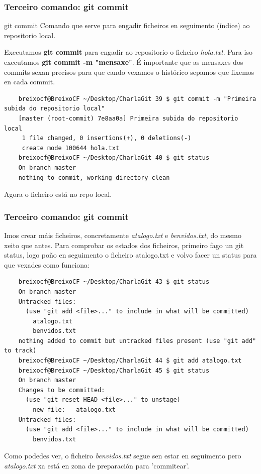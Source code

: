 \begin{frame}[fragile]
	\frametitle{Terceiro comando: git commit}
	\begin{block}{git commit}
		Comando que serve para engadir ficheiros en seguimento (índice) ao repositorio local.
	\end{block}
	\small
	Executamos \textbf{git commit} para engadir ao repositorio o ficheiro \textit{hola.txt}. Para iso executamos \textbf{git commit -m "mensaxe"}. É importante que as mensaxes dos commits sexan precisos para que cando vexamos o histórico sepamos que fixemos en cada commit.
	\tiny 
	\begin{verbatim}
	breixocf@BreixoCF ~/Desktop/CharlaGit 39 $ git commit -m "Primeira subida do repositorio local"
	[master (root-commit) 7e8aa0a] Primeira subida do repositorio local
	 1 file changed, 0 insertions(+), 0 deletions(-)
	 create mode 100644 hola.txt
	breixocf@BreixoCF ~/Desktop/CharlaGit 40 $ git status
	On branch master
	nothing to commit, working directory clean
	\end{verbatim}
	\small
	Agora o ficheiro está no repo local.
\end{frame}

\begin{frame}[fragile]
	\frametitle{Terceiro comando: git commit}
	\scriptsize
	Imos crear máis ficheiros, concretamente \textit{atalogo.txt} e \textit{benvidos.txt}, do mesmo xeito que antes.
	Para comprobar os estados dos ficheiros, primeiro fago un git status, logo poño en seguimento o ficheiro atalogo.txt e volvo facer un status para que vexades como funciona:
	\tiny 
	\begin{verbatim}
	breixocf@BreixoCF ~/Desktop/CharlaGit 43 $ git status
	On branch master
	Untracked files:
	  (use "git add <file>..." to include in what will be committed)
		atalogo.txt
		benvidos.txt
	nothing added to commit but untracked files present (use "git add" to track)
	breixocf@BreixoCF ~/Desktop/CharlaGit 44 $ git add atalogo.txt 
	breixocf@BreixoCF ~/Desktop/CharlaGit 45 $ git status
	On branch master
	Changes to be committed:
	  (use "git reset HEAD <file>..." to unstage)
		new file:   atalogo.txt
	Untracked files:
	  (use "git add <file>..." to include in what will be committed)
		benvidos.txt
	\end{verbatim}
	\scriptsize
	Como podedes ver, o ficheiro \textit{benvidos.txt} segue sen estar en seguimento pero \textit{atalogo.txt} xa está en zona de preparación para 'commitear'. 
\end{frame}


